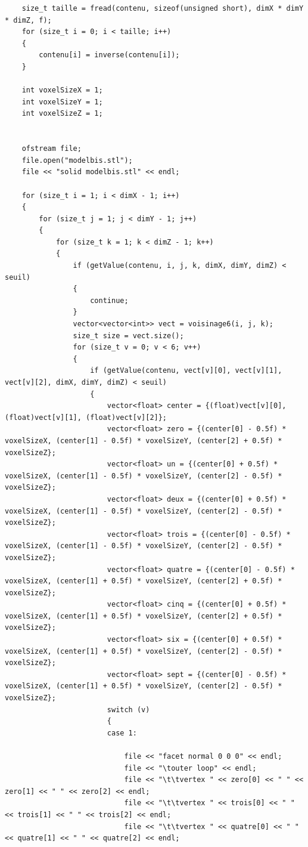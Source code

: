 \documentclass{article}
\begin{document}
\begin{lstlisting}
    size_t taille = fread(contenu, sizeof(unsigned short), dimX * dimY * dimZ, f);
    for (size_t i = 0; i < taille; i++)
    {
        contenu[i] = inverse(contenu[i]);
    }

    int voxelSizeX = 1;
    int voxelSizeY = 1;
    int voxelSizeZ = 1;
    

    ofstream file;
    file.open("modelbis.stl");
    file << "solid modelbis.stl" << endl;

    for (size_t i = 1; i < dimX - 1; i++)
    {
        for (size_t j = 1; j < dimY - 1; j++)
        {
            for (size_t k = 1; k < dimZ - 1; k++)
            {
                if (getValue(contenu, i, j, k, dimX, dimY, dimZ) < seuil)
                {
                    continue;
                }
                vector<vector<int>> vect = voisinage6(i, j, k);
                size_t size = vect.size();
                for (size_t v = 0; v < 6; v++)
                {
                    if (getValue(contenu, vect[v][0], vect[v][1], vect[v][2], dimX, dimY, dimZ) < seuil)
                    {
                        vector<float> center = {(float)vect[v][0], (float)vect[v][1], (float)vect[v][2]};
                        vector<float> zero = {(center[0] - 0.5f) * voxelSizeX, (center[1] - 0.5f) * voxelSizeY, (center[2] + 0.5f) * voxelSizeZ};
                        vector<float> un = {(center[0] + 0.5f) * voxelSizeX, (center[1] - 0.5f) * voxelSizeY, (center[2] - 0.5f) * voxelSizeZ};
                        vector<float> deux = {(center[0] + 0.5f) * voxelSizeX, (center[1] - 0.5f) * voxelSizeY, (center[2] - 0.5f) * voxelSizeZ};
                        vector<float> trois = {(center[0] - 0.5f) * voxelSizeX, (center[1] - 0.5f) * voxelSizeY, (center[2] - 0.5f) * voxelSizeZ};
                        vector<float> quatre = {(center[0] - 0.5f) * voxelSizeX, (center[1] + 0.5f) * voxelSizeY, (center[2] + 0.5f) * voxelSizeZ};
                        vector<float> cinq = {(center[0] + 0.5f) * voxelSizeX, (center[1] + 0.5f) * voxelSizeY, (center[2] + 0.5f) * voxelSizeZ};
                        vector<float> six = {(center[0] + 0.5f) * voxelSizeX, (center[1] + 0.5f) * voxelSizeY, (center[2] - 0.5f) * voxelSizeZ};
                        vector<float> sept = {(center[0] - 0.5f) * voxelSizeX, (center[1] + 0.5f) * voxelSizeY, (center[2] - 0.5f) * voxelSizeZ};
                        switch (v)
                        {
                        case 1:

                            file << "facet normal 0 0 0" << endl;
                            file << "\touter loop" << endl;
                            file << "\t\tvertex " << zero[0] << " " << zero[1] << " " << zero[2] << endl;
                            file << "\t\tvertex " << trois[0] << " " << trois[1] << " " << trois[2] << endl;
                            file << "\t\tvertex " << quatre[0] << " " << quatre[1] << " " << quatre[2] << endl;


\end{lstlisting}
\end{document}
